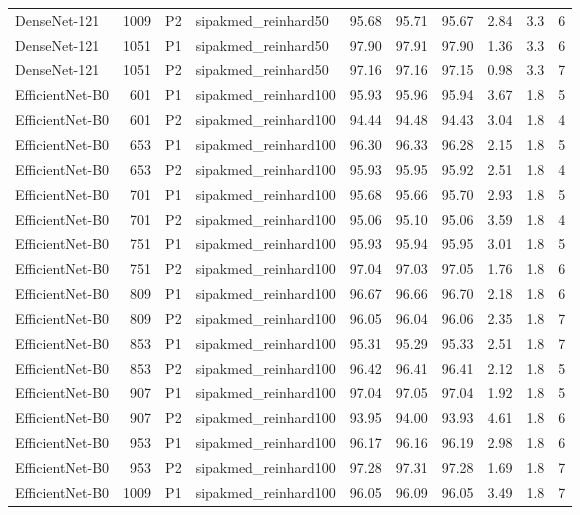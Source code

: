 {\begin{longtable}{lrllrrrrrr}
DenseNet-121 & 1009 & P2 & sipakmed\_reinhard50 & 95.68 & 95.71 & 95.67 & 2.84 & 3.3 & 6 \\
DenseNet-121 & 1051 & P1 & sipakmed\_reinhard50 & 97.90 & 97.91 & 97.90 & 1.36 & 3.3 & 6 \\
DenseNet-121 & 1051 & P2 & sipakmed\_reinhard50 & 97.16 & 97.16 & 97.15 & 0.98 & 3.3 & 7 \\
EfficientNet-B0 & 601 & P1 & sipakmed\_reinhard100 & 95.93 & 95.96 & 95.94 & 3.67 & 1.8 & 5 \\
EfficientNet-B0 & 601 & P2 & sipakmed\_reinhard100 & 94.44 & 94.48 & 94.43 & 3.04 & 1.8 & 4 \\
EfficientNet-B0 & 653 & P1 & sipakmed\_reinhard100 & 96.30 & 96.33 & 96.28 & 2.15 & 1.8 & 5 \\
EfficientNet-B0 & 653 & P2 & sipakmed\_reinhard100 & 95.93 & 95.95 & 95.92 & 2.51 & 1.8 & 4 \\
EfficientNet-B0 & 701 & P1 & sipakmed\_reinhard100 & 95.68 & 95.66 & 95.70 & 2.93 & 1.8 & 5 \\
EfficientNet-B0 & 701 & P2 & sipakmed\_reinhard100 & 95.06 & 95.10 & 95.06 & 3.59 & 1.8 & 4 \\
EfficientNet-B0 & 751 & P1 & sipakmed\_reinhard100 & 95.93 & 95.94 & 95.95 & 3.01 & 1.8 & 5 \\
EfficientNet-B0 & 751 & P2 & sipakmed\_reinhard100 & 97.04 & 97.03 & 97.05 & 1.76 & 1.8 & 6 \\
EfficientNet-B0 & 809 & P1 & sipakmed\_reinhard100 & 96.67 & 96.66 & 96.70 & 2.18 & 1.8 & 6 \\
EfficientNet-B0 & 809 & P2 & sipakmed\_reinhard100 & 96.05 & 96.04 & 96.06 & 2.35 & 1.8 & 7 \\
EfficientNet-B0 & 853 & P1 & sipakmed\_reinhard100 & 95.31 & 95.29 & 95.33 & 2.51 & 1.8 & 7 \\
EfficientNet-B0 & 853 & P2 & sipakmed\_reinhard100 & 96.42 & 96.41 & 96.41 & 2.12 & 1.8 & 5 \\
EfficientNet-B0 & 907 & P1 & sipakmed\_reinhard100 & 97.04 & 97.05 & 97.04 & 1.92 & 1.8 & 5 \\
EfficientNet-B0 & 907 & P2 & sipakmed\_reinhard100 & 93.95 & 94.00 & 93.93 & 4.61 & 1.8 & 6 \\
EfficientNet-B0 & 953 & P1 & sipakmed\_reinhard100 & 96.17 & 96.16 & 96.19 & 2.98 & 1.8 & 6 \\
EfficientNet-B0 & 953 & P2 & sipakmed\_reinhard100 & 97.28 & 97.31 & 97.28 & 1.69 & 1.8 & 7 \\
EfficientNet-B0 & 1009 & P1 & sipakmed\_reinhard100 & 96.05 & 96.09 & 96.05 & 3.49 & 1.8 & 7 \\

\end{longtable}}
